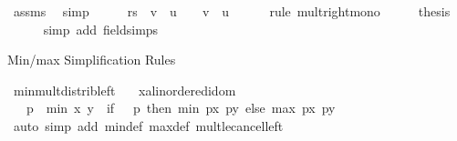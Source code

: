 \begin{isabellebody}
\ assms\ \isamarkupfalse%
\ simp\isanewline
\ \ \isamarkupfalse%
\ \isamarkupfalse%
\ {\isachardoublequoteopen}{\isacharparenleft}{\kern0pt}r{\isacharslash}{\kern0pt}s{\isacharparenright}{\kern0pt}\ {\isacharasterisk}{\kern0pt}\ {\isacharparenleft}{\kern0pt}v\ {\isacharminus}{\kern0pt}\ u{\isacharparenright}{\kern0pt}\ {\isasymle}\ {}\ {\isacharasterisk}{\kern0pt}\ {\isacharparenleft}{\kern0pt}v\ {\isacharminus}{\kern0pt}\ u{\isacharparenright}{\kern0pt}{\isachardoublequoteclose}\isanewline
\ \ \ \ \isamarkupfalse%
\ {\isacharparenleft}{\kern0pt}rule\ mult{\isacharunderscore}{\kern0pt}right{\isacharunderscore}{\kern0pt}mono{\isacharparenright}{\kern0pt}\isanewline
\ \ \isamarkupfalse%
\ \isamarkupfalse%
\ {\isacharquery}{\kern0pt}thesis\isanewline
\ \ \ \ \isamarkupfalse%
\ {\isacharparenleft}{\kern0pt}simp\ add{\isacharcolon}{\kern0pt}\ field{\isacharunderscore}{\kern0pt}simps{\isacharparenright}{\kern0pt}\isanewline
{}\isamarkupfalse%
%
\endisatagproof
{\isafoldproof}%
%
\isadelimproof
\isanewline
%
\endisadelimproof
\isanewline
{}\isamarkupfalse%
%
\begin{isamarkuptext}%
Min/max Simplification Rules%
\end{isamarkuptext}\isamarkuptrue%
\isamarkupfalse%
\ min{\isacharunderscore}{\kern0pt}mult{\isacharunderscore}{\kern0pt}distrib{\isacharunderscore}{\kern0pt}left{\isacharcolon}{\kern0pt}\isanewline
\ \ \ x{\isacharcolon}{\kern0pt}{\isacharcolon}{\kern0pt}{\isachardoublequoteopen}{\isacharprime}{\kern0pt}a{\isacharcolon}{\kern0pt}{\isacharcolon}{\kern0pt}linordered{\isacharunderscore}{\kern0pt}idom{\isachardoublequoteclose}\ \isanewline
\ \ \ {\isachardoublequoteopen}p\ {\isacharasterisk}{\kern0pt}\ min\ x\ y\ {\isacharequal}{\kern0pt}\ {\isacharparenleft}{\kern0pt}if\ {}\ {\isasymle}\ p\ then\ min\ {\isacharparenleft}{\kern0pt}p{\isacharasterisk}{\kern0pt}x{\isacharparenright}{\kern0pt}\ {\isacharparenleft}{\kern0pt}p{\isacharasterisk}{\kern0pt}y{\isacharparenright}{\kern0pt}\ else\ max\ {\isacharparenleft}{\kern0pt}p{\isacharasterisk}{\kern0pt}x{\isacharparenright}{\kern0pt}\ {\isacharparenleft}{\kern0pt}p{\isacharasterisk}{\kern0pt}y{\isacharparenright}{\kern0pt}{\isacharparenright}{\kern0pt}{\isachardoublequoteclose}\isanewline
%
\isadelimproof
%
\endisadelimproof
%
\isatagproof
{}\isamarkupfalse%
\ {\isacharparenleft}{\kern0pt}auto\ simp\ add{\isacharcolon}{\kern0pt}\ min{\isacharunderscore}{\kern0pt}def\ max{\isacharunderscore}{\kern0pt}def\ mult{\isacharunderscore}{\kern0pt}le{\isacharunderscore}{\kern0pt}cancel{\isacharunderscore}{\kern0pt}left{\isacharparenright}{\kern0pt}%

\end{isabellebody}
